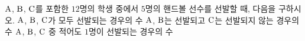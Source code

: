 $\mathrm{A}$, $\mathrm{B}$, $\mathrm{C}$를 포함한 $12$명의 학생 중에서 $5$명의 핸드볼 선수를 선발할 때, 다음을 구하시오.
 $\mathrm{A}$, $\mathrm{B}$, $\mathrm{C}$가 모두 선발되는 경우의 수
 $\mathrm{A}$, $\mathrm{B}$는 선발되고 $\mathrm{C}$는 선발되지 않는 경우의 수
 $\mathrm{A}$, $\mathrm{B}$, $\mathrm{C}$ 중 적어도 $1$명이 선발되는 경우의 수
